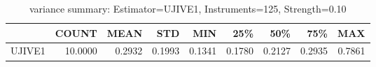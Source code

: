 \begin{table}[ht]
\centering
\caption{variance summary: Estimator=UJIVE1, Instruments=125, Strength=0.10}
\begin{tabular}{lrrrrrrrr}
\toprule
 & COUNT & MEAN & STD & MIN & 25\% & 50\% & 75\% & MAX \\
\midrule
UJIVE1 & 10.0000 & 0.2932 & 0.1993 & 0.1341 & 0.1780 & 0.2127 & 0.2935 & 0.7861 \\
\bottomrule
\end{tabular}
\end{table}
